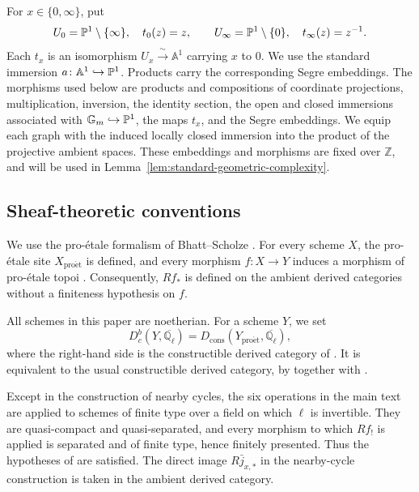 \documentclass[12pt,reqno]{amsart}
\theoremstyle{definition}
\theoremstyle{plain}
\theoremstyle{definition}
\theoremstyle{remark}
\newcommand{\bbA}{\mathbb{A}}  \newcommand{\bbB}{\mathbb{B}}
\newcommand{\bbG}{\mathbb{G}}  \newcommand{\bbH}{\mathbb{H}}
\newcommand{\bbQ}{\mathbb{Q}}  \newcommand{\bbR}{\mathbb{R}}
\newcommand{\ol}[1]{\overline{#1}}
\newcommand{\Ql}{\bbQ_{\ell}}
\newcommand{\Db}{D^b_c}
\newcommand{\Gm}{\bbG_m}
\begin{document}
For \(x\in\{0,\infty\}\), put
\[
 U_0=\mathbb{P}^1\setminus\{\infty\},\quad t_0(z)=z,
 \qquad
 U_\infty=\mathbb{P}^1\setminus\{0\},\quad t_\infty(z)=z^{-1}.
\]
Each \(t_x\) is an isomorphism \(U_x\xrightarrow{\ \sim\ }\bbA^1\) carrying \(x\) to \(0\).
We use the standard immersion \(a\colon\bbA^1\hookrightarrow\bbP^1\).  Products carry the corresponding
Segre embeddings.  The morphisms used below are products and compositions of coordinate projections,
multiplication, inversion, the identity section, the open and closed immersions associated with
\(\Gm\hookrightarrow\bbP^1\), the maps \(t_x\), and the Segre embeddings.  We equip each graph
with the induced locally closed immersion into the product of the projective ambient spaces.  These
embeddings and morphisms are fixed over \(\mathbb Z\), and will be used in 
Lemma~\ref{lem:standard-geometric-complexity}.

\subsection{Sheaf-theoretic conventions}
\label{sec:sheaves}

We use the pro-\'etale formalism of Bhatt--Scholze \cite{BhattScholze2015}.  For every scheme \(X\),
the pro-\'etale site \(X_{\mathrm{pro\acute et}}\) is defined, and every morphism
\(f\colon X\to Y\) induces a morphism of pro-\'etale topoi
\cite[Def.~4.1.1, Lem.~5.4.1]{BhattScholze2015}.  Consequently, \(Rf_*\) is defined on the ambient
derived categories without a finiteness hypothesis on \(f\).

All schemes in this paper are noetherian.  For a scheme \(Y\), we set
\[
        \Db(Y,\ol\Ql)=D_{\mathrm{cons}}(Y_{\mathrm{pro\acute et}},\ol\Ql),
\]
where the right-hand side is the constructible derived category of
\cite[Defs.~6.8.6, 6.8.8]{BhattScholze2015}.  It is equivalent to the usual constructible derived
category, by \cite[Prop.~6.8.14]{BhattScholze2015} together with
\cite[Def.~6.5.1, Prop.~6.6.11]{BhattScholze2015}.

Except in the construction of nearby cycles, the six operations in the main text are applied to schemes
of finite type over a field on which \(\ell\) is invertible.  They are quasi-compact and
quasi-separated, and every morphism to which \(Rf_!\) is applied is separated and of finite type,
hence finitely presented.  Thus the hypotheses of \cite[\S6.7, Rem.~6.8.15]{BhattScholze2015} are
satisfied.  The direct image \(R\bar j_{x,*}\) in the nearby-cycle construction is taken in the ambient
derived category.
\end{document}
